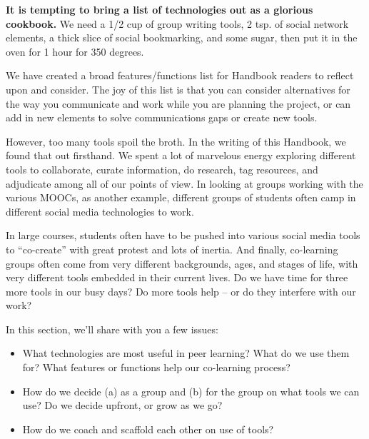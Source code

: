 
\textbf{It is tempting to bring a list of technologies out as a glorious
cookbook.} We need a 1/2 cup of group writing tools, 2 tsp. of social
network elements, a thick slice of social bookmarking, and some sugar,
then put it in the oven for 1 hour for 350 degrees.

We have created a broad features/functions list for Handbook readers to
reflect upon and consider. The joy of this list is that you can consider
alternatives for the way you communicate and work while you are planning
the project, or can add in new elements to solve communications gaps or
create new tools.

However, too many tools spoil the broth. In the writing of this
Handbook, we found that out firsthand. We spent a lot of marvelous
energy exploring different tools to collaborate, curate information, do
research, tag resources, and adjudicate among all of our points of view.
In looking at groups working with the various MOOCs, as another example,
different groups of students often camp in different social media
technologies to work.

In large courses, students often have to be pushed into various social
media tools to ``co-create'' with great protest and lots of inertia. And
finally, co-learning groups often come from very different backgrounds,
ages, and stages of life, with very different tools embedded in their
current lives. Do we have time for three more tools in our busy days? Do
more tools help -- or do they interfere with our work?

In this section, we'll share with you a few issues:

\begin{itemize}
\itemsep1pt\parskip0pt
\item
  What technologies are most useful in peer learning? What do we use
  them for? What features or functions help our co-learning process?
\end{itemize}

\begin{itemize}
\itemsep1pt\parskip0pt
\item
  How do we decide (a) as a group and (b) for the group on what tools we
  can use? Do we decide upfront, or grow as we go?
\end{itemize}

\begin{itemize}
\itemsep1pt\parskip0pt
\item
  How do we coach and scaffold each other on use of tools?
\end{itemize}

